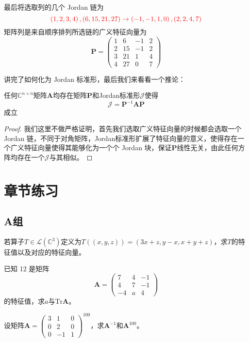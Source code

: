 \begin{example}
最后将选取列的几个 Jordan 链为$$\textcolor{red}{\left( 1,2,3,4 \right),\left( 6,15,21,27 \right) \rightarrow \left( -1,-1,1,0 \right),\left( 2,2,4,7 \right)}$$矩阵列是来自顺序排列所选链的广义特征向量为$$\mathbf{P}=\begin{pmatrix}
	1 & 6 & -1 & 2\\
	2 & 15 & -1 & 2\\
	3 & 21 & 1 & 4\\
	4 & 27 & 0 & 7
	\end{pmatrix}$$
\end{example}

讲完了如何化为 Jordan 标准形，最后我们来看看一个推论：

\begin{corollary}
	任何$\mathbb{C}^{n\times n}$矩阵$\mathbf{A}$均存在矩阵$\mathbf{P}$和Jordan标准形$\mathscr{J}$使得$$\mathscr{J}=\mathbf{P}^{-1}\mathbf{A}\mathbf{P}$$成立
\end{corollary}

\begin{proof}
	我们这里不做严格证明，首先我们选取广义特征向量的时候都会选取一个 Jordan 链，不同于对角矩阵，Jordan标准形扩展了特征向量的意义，使得存在一个广义特征向量使得其能够化为一个个 Jordan 块，保证$\mathbf{P}$线性无关，由此任何方阵均存在一个$\mathscr{J}$与其相似。
\end{proof}

\section{章节练习}

\subsection{A组}

\begin{reidai}
	若算子$T\in \mathcal{L}(\mathbb{C}^3)$定义为$T((x,y,z))=(3x+z,y-x,x+y+z)$，求$T$的特征值以及对应的特征向量。
\end{reidai}

\begin{reidai}
	已知 12 是矩阵$$\mathbf{A}=\begin{pmatrix}
	7 & 4 & -1\\
	4 & 7 & -1\\
	-4 & a & 4
	\end{pmatrix}$$的特征值，求$a$与$\text{Tr}\mathbf{A}$。
\end{reidai}

\begin{reidai}
	设矩阵$\mathbf{A}=\begin{pmatrix}
		3 & 1 & 0 \\
		0 & 2 & 0 \\
		0 & -1 & 1
		\end{pmatrix}^{100}$，求$\mathbf{A}^{-1}$和$\mathbf{A}^{100}$。
\end{reidai}

